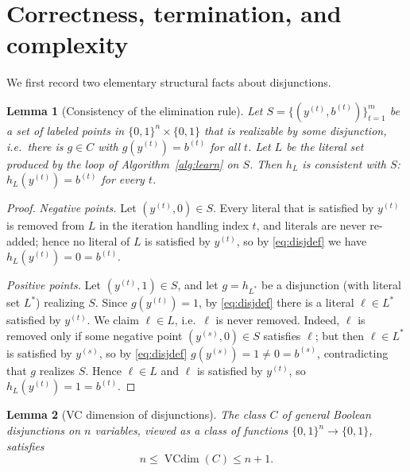 \documentclass{amsart}
\newtheorem{lemma}{Lemma}
\theoremstyle{definition}
\theoremstyle{remark}
\DeclareMathOperator{\VCdim}{VCdim}
\begin{document}
\section{Correctness, termination, and complexity}

We first record two elementary structural facts about disjunctions.

\begin{lemma}[Consistency of the elimination rule]\label{lem:consistent}
Let $S=\{(y^{(t)},b^{(t)})\}_{t=1}^m$ be a set of labeled points in
$\{0,1\}^n\times\{0,1\}$ that is \emph{realizable} by some disjunction, i.e.\
there is $g\in C$ with $g(y^{(t)})=b^{(t)}$ for all $t$. Let $L$ be the literal
set produced by the loop of Algorithm~\ref{alg:learn} on $S$. Then $h_L$ is
consistent with $S$: $h_L(y^{(t)})=b^{(t)}$ for every $t$.
\end{lemma}

\begin{proof}
\emph{Negative points.} Let $(y^{(t)},0)\in S$. Every literal that is satisfied
by $y^{(t)}$ is removed from $L$ in the iteration handling index $t$, and
literals are never re-added; hence no literal of $L$ is satisfied by $y^{(t)}$,
so by \eqref{eq:disjdef} we have $h_L(y^{(t)})=0=b^{(t)}$.

\emph{Positive points.} Let $(y^{(t)},1)\in S$, and let $g=h_{L^*}$ be a
disjunction (with literal set $L^*$) realizing $S$. Since $g(y^{(t)})=1$, by
\eqref{eq:disjdef} there is a literal $\ell\in L^*$ satisfied by $y^{(t)}$. We
claim $\ell\in L$, i.e.\ $\ell$ is never removed. Indeed, $\ell$ is removed only
if some negative point $(y^{(s)},0)\in S$ satisfies $\ell$; but then $\ell\in
L^*$ is satisfied by $y^{(s)}$, so by \eqref{eq:disjdef} $g(y^{(s)})=1\neq
0=b^{(s)}$, contradicting that $g$ realizes $S$. Hence $\ell\in L$ and $\ell$ is
satisfied by $y^{(t)}$, so $h_L(y^{(t)})=1=b^{(t)}$.
\end{proof}

\begin{lemma}[VC dimension of disjunctions]\label{lem:vc}
The class $C$ of general Boolean disjunctions on $n$ variables, viewed as a class
of functions $\{0,1\}^n\to\{0,1\}$, satisfies
\[
n\le \VCdim(C)\le n+1 .
\]
\end{lemma}
\end{document}
